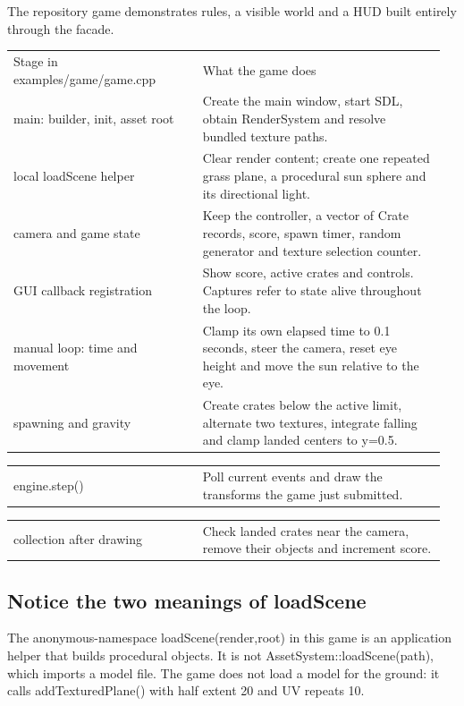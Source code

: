 \documentclass[11pt,a4paper]{article}
\begin{document}
\label{core-74}
The repository game demonstrates rules, a visible world and a HUD built entirely through the facade.

{\small
\begin{longtable}{@{}p{0.42\linewidth}p{0.54\linewidth}@{}}
Stage in examples/game/game.cpp & What the game does \\
main: builder, init, asset root & Create the main window, start SDL, obtain RenderSystem and resolve bundled texture paths. \\
local loadScene helper & Clear render content; create one repeated grass plane, a procedural sun sphere and its directional light. \\
camera and game state & Keep the controller, a vector of Crate records, score, spawn timer, random generator and texture selection counter. \\
GUI callback registration & Show score, active crates and controls. Captures refer to state alive throughout the loop. \\
manual loop: time and movement & Clamp its own elapsed time to 0.1 seconds, steer the camera, reset eye height and move the sun relative to the eye. \\
spawning and gravity & Create crates below the active limit, alternate two textures, integrate falling and clamp landed centers to y=0.5. \\
\end{longtable}
}

{\small
\begin{longtable}{@{}p{0.42\linewidth}p{0.54\linewidth}@{}}
engine.step() & Poll current events and draw the transforms the game just submitted. \\
\end{longtable}
}

{\small
\begin{longtable}{@{}p{0.42\linewidth}p{0.54\linewidth}@{}}
collection after drawing & Check landed crates near the camera, remove their objects and increment score. \\
\end{longtable}
}

\subsection*{Notice the two meanings of loadScene}
The anonymous-namespace loadScene(render,root) in this game is an application helper that builds procedural objects. It is not AssetSystem::loadScene(path), which imports a model file. The game does not load a model for the ground: it calls addTexturedPlane() with half extent 20 and UV repeats 10.
\end{document}

